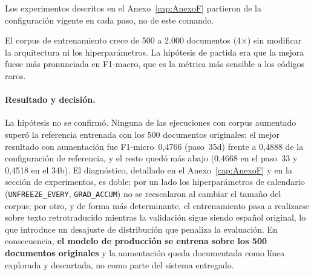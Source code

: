 Los experimentos descritos en el Anexo~\ref{cap:AnexoF} partieron de la configuración vigente en cada paso, no de este comando.

El corpus de entrenamiento crece de 500 a 2.000 documentos (4×) sin modificar la arquitectura ni los hiperparámetros. La hipótesis de partida era que la mejora fuese más pronunciada en F1-macro, que es la métrica más sensible a los códigos raros.

\paragraph{Resultado y decisión.}  La hipótesis no se confirmó. Ninguna de las ejecuciones con corpus aumentado superó la referencia entrenada con los 500 documentos originales: el mejor resultado con aumentación fue F1-micro~0,4766 (paso~35d) frente a 0,4888 de la configuración de referencia, y el resto quedó más abajo (0,4668 en el paso~33 y 0,4518 en el 34b). El diagnóstico, detallado en el Anexo~\ref{cap:AnexoF} y en la sección de experimentos, es doble: por un lado los hiperparámetros de calendario (\texttt{UNFREEZE\_EVERY}, \texttt{GRAD\_ACCUM}) no se reescalaron al cambiar el tamaño del corpus; por otro, y de forma más determinante, el entrenamiento pasa a realizarse sobre texto retrotraducido mientras la validación sigue siendo español original, lo que introduce un desajuste de distribución que penaliza la evaluación. En consecuencia, \textbf{el modelo de producción se entrena sobre los 500 documentos originales} y la aumentación queda documentada como línea explorada y descartada, no como parte del sistema entregado.

